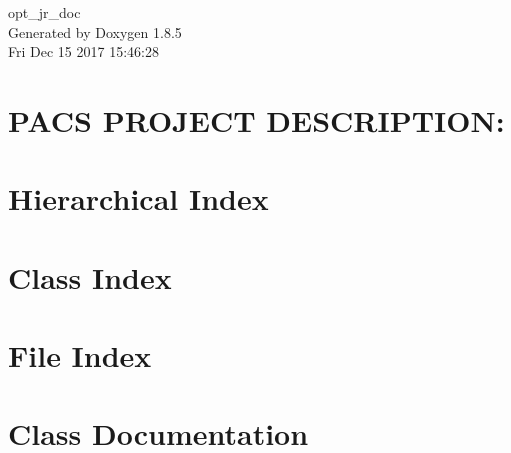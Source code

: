 \documentclass[twoside]{book}
\newcommand{\clearemptydoublepage}{%
  \newpage{\pagestyle{empty}\cleardoublepage}%
}
\begin{document}
\hypersetup{pageanchor=false}
\begin{titlepage}
\vspace*{7cm}
\begin{center}%
{\Large opt\-\_\-jr\-\_\-doc }\\
\vspace*{1cm}
{\large Generated by Doxygen 1.8.5}\\
\vspace*{0.5cm}
{\small Fri Dec 15 2017 15:46:28}\\
\end{center}
\end{titlepage}
\clearemptydoublepage
\tableofcontents
\clearemptydoublepage
{}
\hypersetup{pageanchor=true}

\chapter{P\-A\-C\-S P\-R\-O\-J\-E\-C\-T D\-E\-S\-C\-R\-I\-P\-T\-I\-O\-N\-:}
\label{md__vagrant_PROJECT_SPARK_PACS_PROJECT_README}
\hypertarget{md__vagrant_PROJECT_SPARK_PACS_PROJECT_README}{}

\chapter{Hierarchical Index}

\chapter{Class Index}

\chapter{File Index}

\chapter{Class Documentation}













\end{document}
